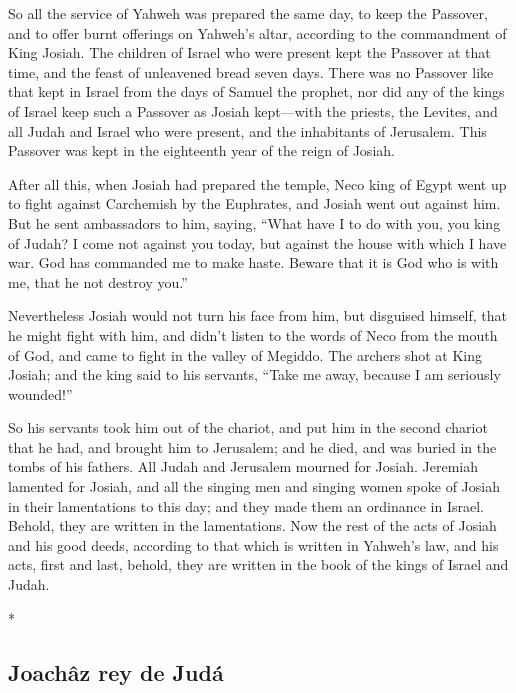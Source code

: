 \begin{paracol}{2}
\begin{otherlanguage}{english}
 So all the service of Yahweh was prepared the same day,
to keep the Passover, and to offer burnt offerings on Yahweh's altar,
according to the commandment of King Josiah.  The
children of Israel who were present kept the Passover at that time, and
the feast of unleavened bread seven days.  There was no
Passover like that kept in Israel from the days of Samuel the prophet,
nor did any of the kings of Israel keep such a Passover as Josiah
kept---with the priests, the Levites, and all Judah and Israel who were
present, and the inhabitants of Jerusalem.  This Passover
was kept in the eighteenth year of the reign of Josiah.

 After all this, when Josiah had prepared the temple,
Neco king of Egypt went up to fight against Carchemish by the Euphrates,
and Josiah went out against him.  But he sent ambassadors
to him, saying, ``What have I to do with you, you king of Judah? I come
not against you today, but against the house with which I have war. God
has commanded me to make haste. Beware that it is God who is with me,
that he not destroy you.''

 Nevertheless Josiah would not turn his face from him,
but disguised himself, that he might fight with him, and didn't listen
to the words of Neco from the mouth of God, and came to fight in the
valley of Megiddo.  The archers shot at King Josiah; and
the king said to his servants, ``Take me away, because I am seriously
wounded!''

 So his servants took him out of the chariot, and put him
in the second chariot that he had, and brought him to Jerusalem; and he
died, and was buried in the tombs of his fathers. All Judah and
Jerusalem mourned for Josiah.  Jeremiah lamented for
Josiah, and all the singing men and singing women spoke of Josiah in
their lamentations to this day; and they made them an ordinance in
Israel. Behold, they are written in the lamentations. 
Now the rest of the acts of Josiah and his good deeds, according to that
which is written in Yahweh's law,  and his acts, first
and last, behold, they are written in the book of the kings of Israel
and Judah.

\end{otherlanguage}

\switchcolumn[0]*

\hypertarget{joachuxe2z-rey-de-juduxe1}{%
\subsection{Joachâz rey de Judá}\label{joachuxe2z-rey-de-juduxe1}}


\end{paracol}
